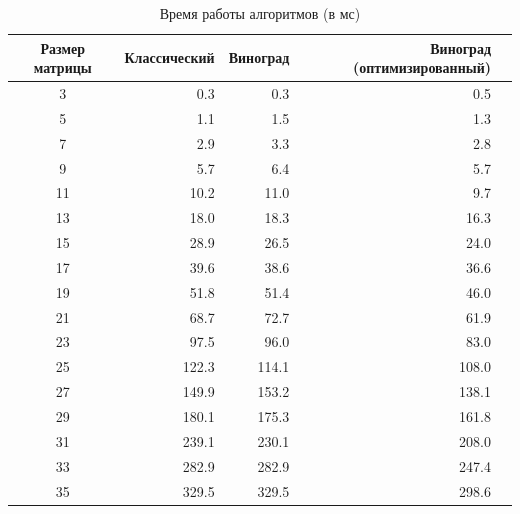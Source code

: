 \begin{table}[h]
	\begin{center}
		\begin{threeparttable}
		\captionsetup{justification=raggedright,singlelinecheck=off}
		\caption{Время работы алгоритмов (в мс)}
		\label{tbl:time_measurements}
		\begin{tabular}{|c|r|r|r|r|}
			\hline
			Размер матрицы & Классический & Виноград & Виноград (оптимизированный) \\
            \hline
			3    & 0.3 & 0.3 & 0.5 \\
            \hline
			5    & 1.1 & 1.5 & 1.3 \\ 
            \hline
			7    & 2.9 & 3.3 & 2.8 \\ 
            \hline
			9    & 5.7 & 6.4 & 5.7 \\ 
			\hline
			11    & 10.2 & 11.0 & 9.7 \\ 
			\hline
			13    & 18.0 & 18.3 & 16.3 \\ 
			\hline
			15    & 28.9 & 26.5 & 24.0 \\ 
			\hline
			17    & 39.6 & 38.6 & 36.6 \\ 
			\hline
			19    & 51.8 & 51.4 & 46.0 \\ 
			\hline
			21    & 68.7 & 72.7 & 61.9 \\ 
			\hline
			23    & 97.5 & 96.0 & 83.0 \\ 
			\hline
            25    & 122.3 & 114.1 & 108.0 \\ 
            \hline
            27    & 149.9 & 153.2 & 138.1 \\ 
            \hline
            29   & 180.1 & 175.3 & 161.8 \\ 
            \hline
            31   & 239.1 & 230.1 & 208.0 \\ 
            \hline
            33   & 282.9 & 282.9 & 247.4 \\ 
            \hline
            35   & 329.5 & 329.5 & 298.6 \\ 
            \hline
		\end{tabular}
		\end{threeparttable}
    \end{center}
\end{table}

\clearpage

